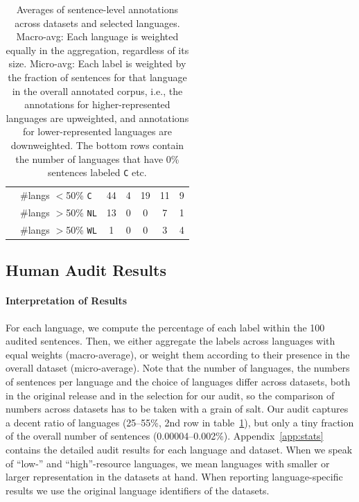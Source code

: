 \begin{table}[th]
\begin{tabular}{llccccc}
                                                                  & \#langs $<$50\% \texttt{C}  & 44                                    & 4                                        & 19                  & 11             & 9            \\
                                                                  & \#langs $>$50\% \texttt{NL} & 13                                    & 0                                        & 0                   & 7              & 1            \\
                                                                  & \#langs $>$50\% \texttt{WL} & 1                                     & 0                                        & 0                   & 3              & 4            \\
        \bottomrule
    \end{tabular}%
    \caption{Averages of sentence-level annotations across datasets and selected languages. Macro-avg: Each language is weighted equally in the aggregation, regardless of its size. Micro-avg: Each label is weighted by the fraction of sentences for that language in the overall annotated corpus, i.e., the annotations for higher-represented languages are upweighted, and annotations for lower-represented languages are downweighted. The bottom rows contain the number of languages that have 0\% sentences labeled \texttt{C} etc. }
    \label{tab:results}
\end{table}

\subsection{Human Audit Results}\label{sec:audit-res}



\paragraph{Interpretation of Results}
For each language, we compute the percentage of each label within the 100 audited sentences.
Then, we either aggregate the labels across languages with equal weights (macro-average), or weight them according to their presence in the overall dataset (micro-average).
Note that the number of languages, the numbers of sentences per language and the choice of languages differ across datasets, both in the original release and in the selection for our audit, so the comparison of numbers across datasets has to be taken with a grain of salt. Our audit captures a decent ratio of languages (25--55\%, 2nd row in table~\ref{tab:results}), but only a tiny fraction of the overall number of sentences (0.00004--0.002\%). Appendix~\ref{app:stats}
contains the detailed audit results for each language and dataset. When we speak of ``low-'' and ``high''-resource languages, we mean languages with smaller or larger representation in the datasets at hand. When reporting language-specific results we use the original language identifiers of the datasets.

